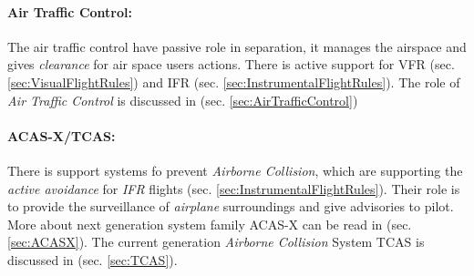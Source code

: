 \paragraph{Air Traffic Control:} The air traffic control have passive role in separation, it manages the airspace and gives \emph{clearance} for air space users actions. There is active support for VFR (sec. \ref{sec:VisualFlightRules}) and IFR (sec. \ref{sec:InstrumentalFlightRules}). The role of \emph{Air Traffic Control} is discussed in (sec. \ref{sec:AirTrafficControl})

\paragraph{ACAS-X/TCAS:} There is support systems fo prevent \emph{Airborne Collision}, which are supporting the \emph{active avoidance} for \emph{IFR} flights (sec. \ref{sec:InstrumentalFlightRules}). Their role is to provide the surveillance of \emph{airplane} surroundings and give advisories to pilot. More about next generation system family ACAS-X can be read in (sec. \ref{sec:ACASX}). The current generation \emph{Airborne Collision} System TCAS is discussed in (sec. \ref{sec:TCAS}).

